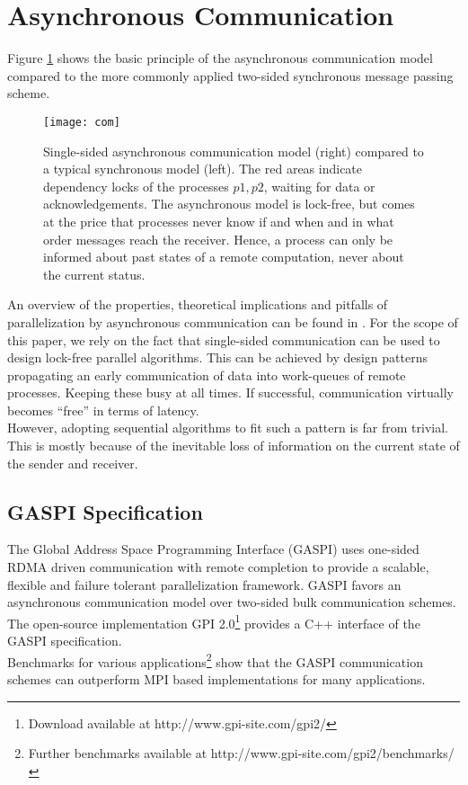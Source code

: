 \documentclass{acm_proc_article-sp}
\begin{document}
\section{Asynchronous Communication} \label{sec_ac} 
Figure \ref{fig_async} shows the basic principle of the asynchronous 
communication model compared to the more commonly applied two-sided
synchronous message passing scheme.
\begin{figure}[ht]
\texttt{[image: com]}
\caption{Single-sided asynchronous communication model (right) compared to a typical 
synchronous model (left). The red areas indicate dependency locks of the 
processes $p1,p2$, waiting for data or acknowledgements. The asynchronous model
is lock-free, but comes at the price that processes never know if and when and 
in what order messages reach the receiver. Hence, a process can only be informed
about past states of a remote computation, never about the current status.   
\label{fig_async}
}
\end{figure}
An overview of the properties, theoretical implications and pitfalls of parallelization by 
asynchronous communication can be found in \cite{shan2012accelerating}. For the scope of this paper,
we rely on the fact that single-sided communication can be used to design lock-free
parallel algorithms. This can be achieved by design patterns propagating 
an early communication of data into work-queues of remote processes. Keeping
these busy at all times. If successful, communication virtually becomes ``free''
in terms of latency.\\
However, adopting sequential algorithms to fit such a pattern is far from trivial.
This is mostly because of the inevitable loss of information on the current state
of the sender and receiver.        

\subsection{GASPI Specification} \label{sec_gpi}
The Global Address Space Programming Interface (GASPI) \cite{grunewald2013gaspi}
 uses one-sided 
RDMA driven communication with remote completion to provide a scalable, flexible and
failure tolerant parallelization framework. GASPI favors an asynchronous communication 
model over two-sided bulk communication schemes. 
The open-source implementation GPI 2.0\footnote{Download available at http://www.gpi-site.com/gpi2/}
provides a C++ interface of the GASPI specification.\\
Benchmarks for various applications\footnote{Further benchmarks available at
http://www.gpi-site.com/gpi2/benchmarks/} show that 
the GASPI communication schemes can outperform MPI based implementations
\cite{grunewald2012bqcd} \cite{machado2011unbalanced} for many applications.
\end{document}
